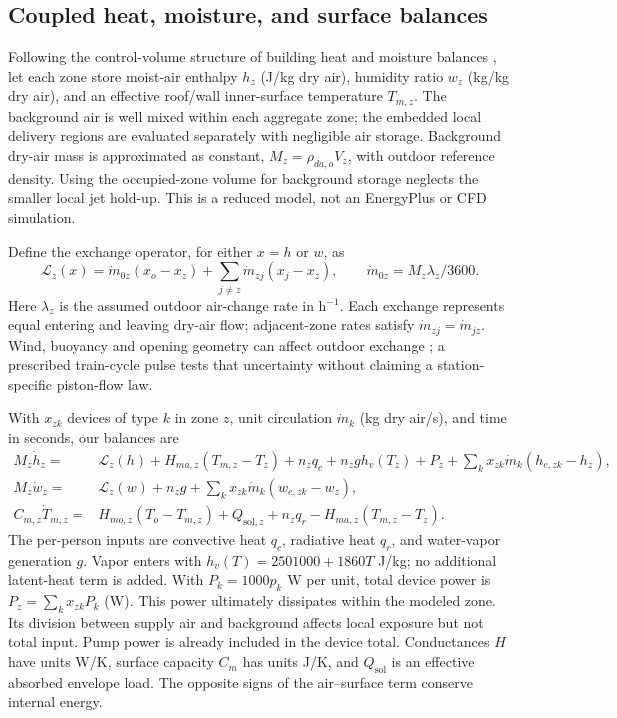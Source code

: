 \subsection{Coupled heat, moisture, and surface balances}

Following the control-volume structure of building heat and moisture balances \cite{epzone}, let each zone store moist-air enthalpy $h_z$ (J/kg dry air), humidity ratio $w_z$ (kg/kg dry air), and an effective roof/wall inner-surface temperature $T_{m,z}$. The background air is well mixed within each aggregate zone; the embedded local delivery regions are evaluated separately with negligible air storage. Background dry-air mass is approximated as constant, $M_z=\rho_{da,o}V_z$, with outdoor reference density. Using the occupied-zone volume for background storage neglects the smaller local jet hold-up. This is a reduced model, not an EnergyPlus or CFD simulation.

Define the exchange operator, for either $x=h$ or $w$, as
\begin{equation}
 \mathcal L_z(x)=\dot m_{0z}(x_o-x_z)+\sum_{j\ne z}\dot m_{zj}(x_j-x_z),
 \qquad \dot m_{0z}=M_z\lambda_z/3600.
\label{eq:rail-exchange}
\end{equation}
Here $\lambda_z$ is the assumed outdoor air-change rate in h$^{-1}$. Each exchange represents equal entering and leaving dry-air flow; adjacent-zone rates satisfy $\dot m_{zj}=\dot m_{jz}$. Wind, buoyancy and opening geometry can affect outdoor exchange \cite{ventilation}; a prescribed train-cycle pulse tests that uncertainty without claiming a station-specific piston-flow law.

With $x_{zk}$ devices of type $k$ in zone $z$, unit circulation $\dot m_k$ (kg dry air/s), and time in seconds, our balances are
\begin{align}
 M_z\dot h_z={}&\mathcal L_z(h)+H_{ma,z}(T_{m,z}-T_z)
 +n_zq_c+n_zg h_v(T_z)+P_z
 +\sum_k x_{zk}\dot m_k(h_{e,zk}-h_z),\label{eq:rail-enthalpy}\\
 M_z\dot w_z={}&\mathcal L_z(w)+n_zg+
 \sum_k x_{zk}\dot m_k(w_{e,zk}-w_z),\label{eq:rail-moisture}\\
 C_{m,z}\dot T_{m,z}={}&H_{mo,z}(T_o-T_{m,z})+Q_{\mathrm{sol},z}
 +n_zq_r-H_{ma,z}(T_{m,z}-T_z).\label{eq:rail-surface}
\end{align}
The per-person inputs are convective heat $q_c$, radiative heat $q_r$, and water-vapor generation $g$. Vapor enters with $h_v(T)=2501000+1860T$ J/kg; no additional latent-heat term is added. With $P_k=1000p_k$ W per unit, total device power is $P_z=\sum_k x_{zk}P_k$ (W). This power ultimately dissipates within the modeled zone. Its division between supply air and background affects local exposure but not total input. Pump power is already included in the device total. Conductances $H$ have units W/K, surface capacity $C_m$ has units J/K, and $Q_{\mathrm{sol}}$ is an effective absorbed envelope load. The opposite signs of the air--surface term conserve internal energy.

